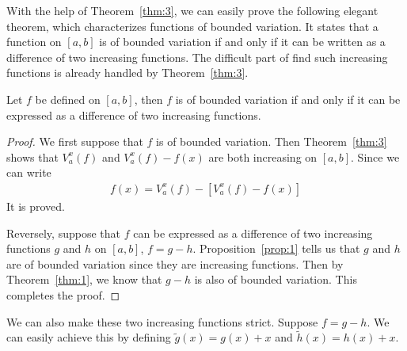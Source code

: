 \documentclass[thmcnt=section, color=blue, 12pt]{my-elegantbook}
\begin{document}
With the help of Theorem~\ref{thm:3}, we can easily prove
the following elegant theorem,
which characterizes functions of bounded variation.
It states that a function on $[a, b]$ is of bounded variation
if and only if it can be written as a difference of two increasing functions.
The difficult part of find such increasing functions
is already handled by Theorem~\ref{thm:3}.

\begin{theorem} \label{thm:4}
	Let $f$ be defined on $[a, b]$,
	then $f$ is of bounded variation if and only if
	it can be expressed as a difference of two
	increasing functions.
\end{theorem}

\begin{proof}
	We first suppose that $f$ is of bounded variation.
	Then Theorem~\ref{thm:3} shows that $V_a^x(f)$
	and $V_a^x(f) - f(x)$ are both increasing on $[a, b]$.
	Since we can write
	\begin{align*}
		f(x) = V_a^x(f) - [ V_a^x (f) - f(x)]
	\end{align*}
	It is proved.

	Reversely, suppose that $f$ can be expressed as a difference of
	two increasing functions $g$ and $h$ on $[a, b]$, $f = g - h$.
	Proposition~\ref{prop:1} tells us that $g$ and $h$ are of bounded variation
	since they are increasing functions.
	Then by Theorem~\ref{thm:1}, we know that $g - h$ is also of bounded variation.
	This completes the proof.
\end{proof}

\begin{note}
	We can also make these two increasing functions strict.
	Suppose $f = g - h$.
	We can easily achieve this by defining $\tilde{g}(x) = g(x) + x$
	and $\tilde{h}(x) = h(x) + x$.
\end{note}





\printbibliography[heading=bibintoc, title=References]


\printindex
\end{document}
